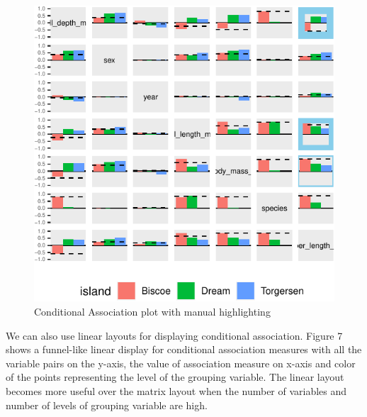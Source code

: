 \begin{Schunk}
\begin{figure}

{\centering \includegraphics{rj_paper_files/figure-latex/unnamed-chunk-13-1} 

}

\caption[Conditional Association plot with manual highlighting]{Conditional Association plot with manual highlighting}\label{fig:unnamed-chunk-13}
\end{figure}
\end{Schunk}

We can also use linear layouts for displaying conditional association.
Figure 7 shows a funnel-like linear display for conditional association
measures with all the variable pairs on the y-axis, the value of
association measure on x-axis and color of the points representing the
level of the grouping variable. The linear layout becomes more useful
over the matrix layout when the number of variables and number of levels
of grouping variable are high.

